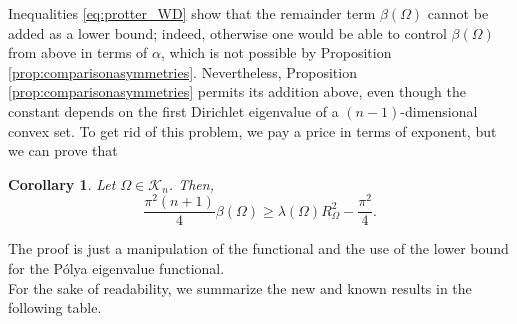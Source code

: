 \documentclass[oneside,a4paper,11pt,notitlepage]{article}
\theoremstyle{definition}
\theoremstyle{plain}
\newtheorem{corollario}[teorema]{Corollary}
\theoremstyle{definition}
\begin{document}

Inequalities \eqref{eq:protter_WD} show that the remainder term $\beta(\Omega)$ cannot be added as a lower bound; indeed, otherwise one would be able to control $\beta(\Omega)$ from above in terms of $\alpha$, which is not possible by Proposition \ref{prop:comparisonasymmetries}.
Nevertheless, Proposition \ref{prop:comparisonasymmetries} permits its addition above, even though the constant depends on the first Dirichlet eigenvalue of a $(n-1)$-dimensional convex set. To get rid of this problem, we pay a price in terms of exponent, but we can prove that
\begin{corollario}
\label{cor:quantitative_lr}
  Let $\Omega\in \mathcal{K}_n$. Then, 
\begin{equation}\label{quantitative_LR}
 \frac{\pi^2(n+1)}{4}\beta(\Omega)\ge\lambda( \Omega)R^2_\Omega-\frac{\pi^2}{4}.
\end{equation}
\end{corollario}
The proof is just a manipulation of the functional and the use of the lower bound for the P\'olya eigenvalue functional.\\

\noindent For the sake of readability, we summarize the new and known results in the following table.
\end{document}
